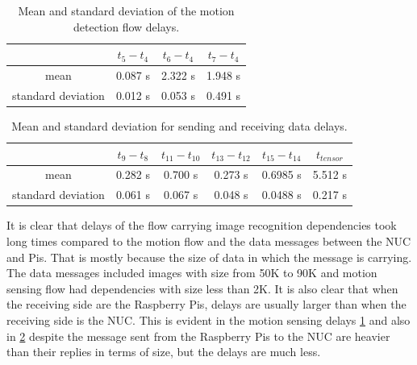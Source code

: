 \begin{table}[H]
\centering
\begin{tabular}{c|c|c|c}\toprule
&$t_5 - t_4$  & $t_6 - t_4$  & $t_7-t_4$ \\ \midrule
mean &0.087 s&2.322 s&1.948 s\\
standard deviation&0.012 s&0.053 s&0.491 s\\
\end{tabular}
\caption{Mean and standard deviation of the motion detection flow delays.}
\label{table:motion}
\end{table}

\begin{table}[H]
\centering
\begin{tabular}{c|c|c|c|c|c}	\toprule
&$t_9 - t_8$  & $t_{11} - t_{10}$  & $t_{13}-t_{12}$ & $t_{15}-t_{14}$&  $t_{tensor}$ \\ \midrule
mean&0.282 s&0.700 s&	0.273 s&0.6985 s&5.512 s\\
standard deviation&0.061 s&0.067 s&	0.048 s&0.0488 s&0.217 s\\
	\end{tabular}
	\caption{Mean and standard deviation for sending and receiving data delays.}
	\label{table:data}
\end{table}

\noindent It is clear that  delays of the flow carrying image recognition dependencies took long times compared to the motion flow and the data messages between the NUC and Pis. That is mostly because the size of data in which the message is carrying. The data messages included images with size from 50K to 90K  and motion sensing flow had dependencies with size less than 2K. It is also clear that when the receiving side are the Raspberry Pis, delays are usually larger than when the receiving side is the NUC. This is evident in the motion sensing delays \ref{table:motion} and  also in \ref{table:data} despite the message sent from the Raspberry Pis to the NUC are heavier than their replies  in terms of size, but the delays are much less.

